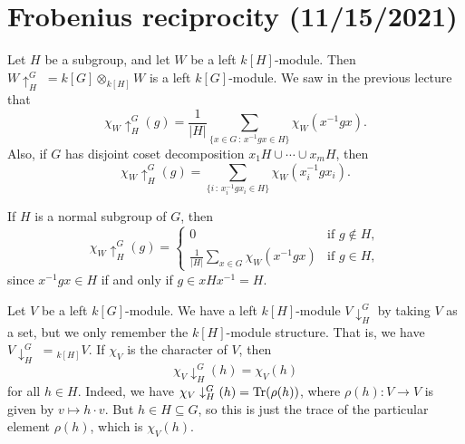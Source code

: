 \section{Frobenius reciprocity (11/15/2021)}
Let $H$ be a subgroup, and let $W$ be a left $k[H]$-module. Then 
$W \uparrow_H^G\;= k[G] \otimes_{k[H]} W$ is a left $k[G]$-module. 
We saw in the previous lecture that 
\[ \chi_W \uparrow_H^G(g) = \frac{1}{|H|} \sum_{\{x\in G\,:\,x^{-1}gx \in H\}} \chi_W(x^{-1}gx). \] 
Also, if $G$ has disjoint coset decomposition $x_1H \cup \cdots \cup x_mH$, then 
\[ \chi_W \uparrow_H^G(g) = \sum_{\{i\,:\,x_i^{-1}gx_i \in H\}} \chi_W(x_i^{-1}gx_i). \] 

\begin{remark}{}
    If $H$ is a normal subgroup of $G$, then 
    \[ \chi_W \uparrow_H^G (g) = \begin{cases} 
        0 & \text{if } g \notin H, \\ 
        \frac{1}{|H|} \sum_{x\in G} \chi_W(x^{-1}gx) & \text{if } g \in H,
    \end{cases} \] 
    since $x^{-1}gx \in H$ if and only if $g \in xHx^{-1} = H$. 
\end{remark}

Let $V$ be a left $k[G]$-module. We have a left $k[H]$-module $V \downarrow_H^G$
by taking $V$ as a set, but we only remember the $k[H]$-module structure. 
That is, we have $V \downarrow_H^G\;= {}_{k[H]} V$. If $\chi_V$ is the 
character of $V$, then 
\[ \chi_V \downarrow_H^G (h) = \chi_V(h) \] 
for all $h \in H$. Indeed, we have $\chi_V \downarrow_H^G (h) = \operatorname{Tr}(\rho(h))$, 
where $\rho(h) : V \to V$ is given by $v \mapsto h \cdot v$. But $h \in H 
\subseteq G$, so this is just the trace of the particular element $\rho(h)$, 
which is $\chi_V(h)$. 

